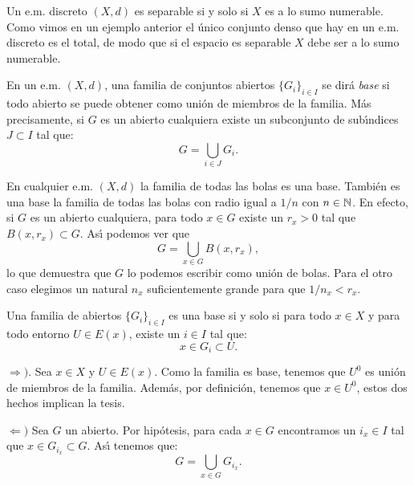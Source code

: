 \begin{ejemplo} Un e.m. discreto $(X,d)$ es separable si y solo si
$X$ es a lo sumo numerable. Como vimos en un ejemplo anterior el
\'unico conjunto denso que hay en un e.m. discreto es el total, de
modo que si el espacio es separable $X$ debe ser a lo sumo
numerable.
\end{ejemplo}

\begin{definicion} En un e.m. $(X,d)$, una familia de conjuntos
abiertos $\{G_i\}_{i\in I}$ se dir\'a \emph{base} si todo abierto
se puede obtener como uni\'on de miembros de la familia. M\'as
precisamente, si $G$ es un abierto cualquiera existe un
subconjunto de sub\'{\i}ndices $J\subset I$ tal que:
\[
    G=\bigcup_{i\in J}G_i.
\]
\end{definicion}

\begin{ejemplo} En cualquier e.m. $(X,d)$ la familia de todas las
bolas es una base. Tambi\'en es una base la familia de todas las
bolas con radio igual a $1/n$ con $n\in \nn$. En efecto, si $G$ es
un abierto cualquiera, para todo $x\in G$ existe un $r_x>0$ tal
que $B(x,r_x)\subset G$. As\'{\i} podemos ver que
\[
    G=\bigcup\limits_{x\in G}B(x,r_x),
\]
lo que demuestra que $G$ lo podemos escribir como uni\'on de
bolas. Para el otro caso elegimos un natural $n_x$ suficientemente
grande para que $1/n_x<r_x$.
\end{ejemplo}

\begin{proposicion}\label{pro,caracbase} Una familia de abiertos $\{G_i\}_{i\in I}$ es
una base si y solo si para todo $x\in X$ y para todo entorno $U\in
E(x)$, existe un $i\in I$ tal que:
\[
    x\in G_i\subset U.
\]
\end{proposicion}
\begin{demo} $\Rightarrow )$. Sea $x\in X$ y $U\in E(x)$. Como la familia es
base, tenemos que $U^0$ es uni\'on de miembros de la familia.
Adem\'as, por definici\'on, tenemos que $x\in U^0$, estos dos
hechos implican la tesis.

$\Leftarrow)$ Sea $G$ un abierto. Por hip\'otesis, para cada $x\in
G$ encontramos un $i_x\in I$ tal que $x\in G_{i_x}\subset G$.
As\'{\i} tenemos que:
\[
    G=\bigcup\limits_{x\in G}G_{i_x}.
\]
\end{demo}

